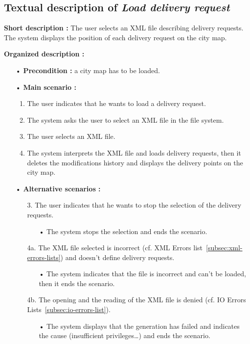 \documentclass[paper=a4,fontsize=11pt]{report}
\numberwithin{equation}{section}		%
\numberwithin{figure}{section}		%
\numberwithin{table}{section}		%
\renewcommand{\it}[1]{\textit{#1}}
\begin{document}
\subsection{Textual description of \it{Load delivery request}}
\label{subsec:textual-description-of-load-delivery-request}

\textbf{Short description :} The user selects an XML file describing delivery requests. The system displays the position of each delivery request on the city map.

\textbf{Organized description :}

\begin{itemize}
  \item[•] \textbf{Precondition :} a city map has to be loaded.
  \item[•] \textbf{Main scenario :}
  \begin{enumerate}
    \item The user indicates that he wants to load a delivery request.
    \item The system asks the user to select an XML file in the file system.
    \item The user selects an XML file.
    \item The system interprets the XML file and loads delivery requests, then it deletes the modifications history and displays the delivery points on the city map.
  \end{enumerate}
  \item[•] \textbf{Alternative scenarios :}
  \begin{itemize}
    \item[3.] The user indicates that he wants to stop the selection of the delivery requests.
    \begin{itemize}
      \item[•] The system stops the selection and ends the scenario.
    \end{itemize}
    \item[4a.] The XML file selected is incorrect (cf. XML Errors list~\ref{subsec:xml-errors-lists}) and doesn’t define delivery requests.
    \begin{itemize}
      \item[•] The system indicates that the file is incorrect and can’t be loaded, then it ends the scenario.
    \end{itemize}
    \item[4b.] The opening and the reading of the XML file is denied (cf. IO Errors Lists~\ref{subsec:io-errors-list}).
    \begin{itemize}
      \item[•] The system displays that the generation has failed and indicates the cause (insufficient privileges…) and ends the scenario.
    \end{itemize}
  \end{itemize}
\end{itemize}
\end{document}
